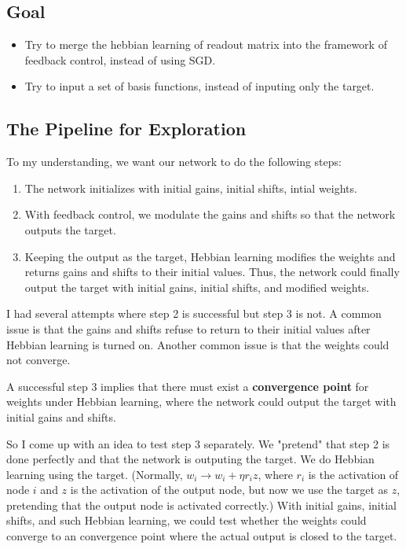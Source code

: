 \documentclass[12pt, a4paper]{article}
\begin{document}
\subsection*{Goal}

\noindent
\begin{itemize}
    \item Try to merge the hebbian learning of readout matrix into the framework of feedback control, instead of using SGD.
    \item Try to input a set of basis functions, instead of inputing only the target.

\end{itemize}

\newpage

\subsection*{The Pipeline for Exploration}

To my understanding, we want our network to do the following steps:

\begin{enumerate}
    \item The network initializes with initial gains, initial shifts, intial weights.
    \item With feedback control, we modulate the gains and shifts so that the network outputs the target.
    \item Keeping the output as the target, Hebbian learning modifies the weights and returns gains and shifts to their initial values. Thus, the network could finally output the target with initial gains, initial shifts, and modified weights. 
\end{enumerate}

I had several attempts where step 2 is successful but step 3 is not. A common issue is that the gains and shifts refuse to return to their initial values after Hebbian learning is turned on. Another common issue is that the weights could not converge.

A successful step 3 implies that there must exist a \textbf{convergence point} for weights under Hebbian learning, where the network could output the target with initial gains and shifts.

So I come up with an idea to test step 3 separately. We "pretend" that step 2 is done perfectly and that the network is outputing the target. We do Hebbian learning using the target. (Normally, $w_{i} \rightarrow w_{i} + \eta r_i z$, where $r_i$ is the activation of node $i$ and $z$ is the activation of the output node, but now we use the target as $z$, pretending that the output node is activated correctly.) With initial gains, initial shifts, and such Hebbian learning, we could test whether the weights could converge to an convergence point where the actual output is closed to the target.
\end{document}
